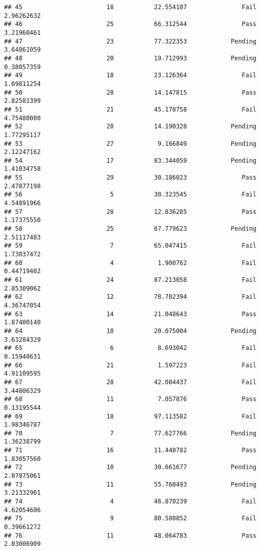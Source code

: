 \documentclass[
]{article}
\begin{document}
\begin{verbatim}
## 45                       18           22.554107               Fail   2.96262632
## 46                       25           66.312544               Pass   3.21960461
## 47                       23           77.322353            Pending   3.64861059
## 48                       20           19.712993            Pending   0.38057359
## 49                       18           23.126364               Fail   1.69811254
## 50                       28           14.147815               Pass   2.82581399
## 51                       21           45.178758               Fail   4.75480080
## 52                       28           14.190328            Pending   1.77295117
## 53                       27            9.166849            Pending   2.12247162
## 54                       17           83.344059            Pending   1.41034758
## 55                       29           30.186023               Pass   2.47877198
## 56                        5           30.323545               Fail   4.54891966
## 57                       28           12.836285               Pass   1.17375550
## 58                       25           67.779623            Pending   2.51117483
## 59                        7           65.047415               Fail   1.73037472
## 60                        4            1.900762               Fail   0.44719402
## 61                       24           87.213058               Fail   2.85309062
## 62                       12           78.702394               Fail   4.36747054
## 63                       14           21.048643               Pass   1.87400140
## 64                       10           20.075004            Pending   3.63284329
## 65                        6            8.693042               Fail   0.15948631
## 66                       21            1.597223               Fail   4.91109595
## 67                       28           42.084437               Fail   3.44806329
## 68                       11            7.057876               Pass   0.13195544
## 69                       18           97.113582               Fail   1.98346787
## 70                        7           77.627766            Pending   1.36238799
## 71                       16           11.440782               Pass   1.83057560
## 72                       10           30.661677            Pending   2.07875061
## 73                       11           55.760493            Pending   3.21332961
## 74                        4           46.870239               Fail   4.62054606
## 75                        9           80.580852               Fail   0.39661272
## 76                       11           48.064783               Pass   2.03006909

\end{verbatim}
\end{document}
